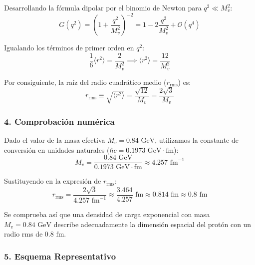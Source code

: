 \begin{problema}
Desarrollando la fórmula dipolar por el binomio de Newton para $q^2 \ll M_v^2$:
\begin{equation}
G(q^2) = \left( 1 + \frac{q^2}{M_v^2} \right)^{-2} = 1 - 2 \frac{q^2}{M_v^2} + \mathcal{O}(q^4)
\end{equation}

Igualando los términos de primer orden en $q^2$:
\begin{equation}
\frac{1}{6} \langle r^2 \rangle = \frac{2}{M_v^2} \implies \langle r^2 \rangle = \frac{12}{M_v^2}
\end{equation}

Por consiguiente, la raíz del radio cuadrático medio ($r_{\text{rms}}$) es:
\begin{equation}
r_{\text{rms}} \equiv \sqrt{\langle r^2 \rangle} = \frac{\sqrt{12}}{M_v} = \frac{2\sqrt{3}}{M_v}
\end{equation}

\subsubsection*{4. Comprobación numérica}

Dado el valor de la masa efectiva $M_v = 0.84\text{ GeV}$, utilizamos la constante de conversión en unidades naturales ($\hbar c = 0.1973\text{ GeV}\cdot\text{fm}$):
\begin{equation}
M_v = \frac{0.84\text{ GeV}}{0.1973\text{ GeV}\cdot\text{fm}} \approx 4.257\text{ fm}^{-1}
\end{equation}

Sustituyendo en la expresión de $r_{\text{rms}}$:
\begin{equation}
r_{\text{rms}} = \frac{2\sqrt{3}}{4.257\text{ fm}^{-1}} \approx \frac{3.464}{4.257}\text{ fm} \approx 0.814\text{ fm} \approx 0.8\text{ fm}
\end{equation}

Se comprueba así que una densidad de carga exponencial con masa $M_v = 0.84\text{ GeV}$ describe adecuadamente la dimensión espacial del protón con un radio rms de $0.8\text{ fm}$.

\subsubsection*{5. Esquema Representativo}

\begin{center}
\end{center}
\end{problema}
